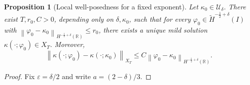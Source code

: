 \documentclass[11pt,reqno]{amsart}
\theoremstyle{plain}
\newtheorem{proposition}[theorem]{Proposition}
\theoremstyle{definition}
\numberwithin{equation}{section}
\newcommand{\mc}[1]{\mathcal{#1}}
\newcommand{\wt}[1]{\widetilde{#1}}
\newcommand{\norm}[1]{\left\lVert #1 \right\rVert}
\newcommand{\vph}{\varphi}
\newcommand{\R}{\mathbb{R}}
\newcommand{\thi}[1]{\wt H^{#1}(I)}
\newcommand{\hr}[1]{H^{#1}(\R)}
\begin{document}
\begin{proposition}[Local well-posedness for a fixed exponent]
\label{prop:local-fixed-exponent}
Let $\kappa_0\in\mc U_\delta$. There exist $T,r_0,C>0$, depending only on
$\delta,\kappa_0$, such that for every $\vph_0\in\thi{-\frac12+\delta}$ with
$\norm{\vph_0-\kappa_0}_{\hr{-\frac12+\delta}}\le r_0$, there exists a unique mild
solution $\kappa(\cdot;\vph_0)\in X_T$. Moreover,
\begin{equation}\label{eqn:local-fixed-lipschitz}
    \norm{\kappa(\cdot;\vph_0)-\kappa(\cdot;\kappa_0)}_{X_T}
    \le C\norm{\vph_0-\kappa_0}_{\hr{-\frac12+\delta}}.
\end{equation}
\end{proposition}
\begin{proof}
Fix $\varepsilon=\delta/2$ and write $a=(2-\delta)/3$.


\end{proof}
\end{document}
